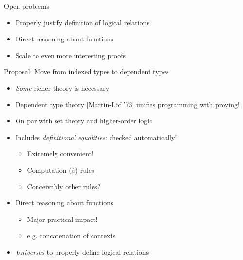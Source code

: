 \documentclass[usenames,dvipsnames]{beamer}
\begin{document}
\begin{frame}{Open problems}
\begin{itemize}
\item Properly justify definition of logical relations
\item Direct reasoning about functions
\item Scale to even more interesting proofs
\end{itemize}
\end{frame}

\begin{frame}{Proposal: Move from indexed types to dependent types}
\begin{itemize}
\item \emph{Some} richer theory is necessary
\item Dependent type theory [Martin-L\"of '73] unifies programming with proving!
\item On par with set theory and higher-order logic
\item Includes \emph{definitional equalities}: checked automatically!
\begin{itemize}
\item Extremely convenient!
\item Computation ($\beta$) rules
\item Conceivably other rules?
\end{itemize}
\item Direct reasoning about functions
\begin{itemize}
\item Major practical impact!
\item e.g. concatenation of contexts
\end{itemize}
\item \emph{Universes} to properly define logical relations
\end{itemize}
\end{frame}
\end{document}
